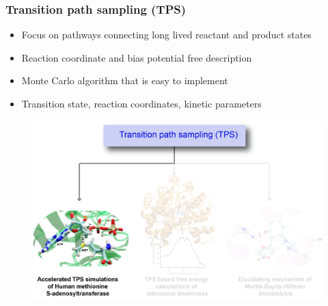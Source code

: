 \documentclass{beamer}
\begin{document}
\begin{frame}
\frametitle{Transition path sampling (TPS)}
\pause
{}
\begin{block}
{
    \begin{itemize}
        \item Focus on pathways connecting long lived reactant and product states 
        \item Reaction coordinate and bias potential free description
        \item Monte Carlo algorithm that is easy to implement
        \item Transition state, reaction coordinates, kinetic parameters
    \end{itemize}
}
\end{block}
\end{frame}
\begin{frame}
 \begin{figure}
\centering
\includegraphics[scale=0.6]{figures/sree_outline_1.png}
  \end{figure}
\end{frame}
\end{document}
